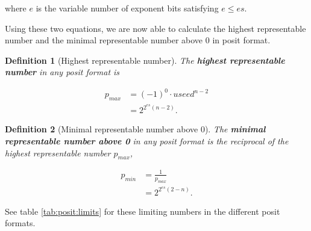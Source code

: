\documentclass{article}
\theoremstyle{plain} %
\newtheorem{definition}{Definition}[section]
\theoremstyle{convention} %
\theoremstyle{remark} %
\def\df#1{\textbf{\textit{#1}}}
\numberwithin{equation}{section}
\begin{document}
where $e$ is the variable number of exponent bits satisfying $e \le es$.

Using these two equations, we are now able to calculate the highest representable number and the minimal representable number above \num{0} in posit format.

\begin{definition}[Highest representable number]

The \df{highest representable number} in any posit format is

\begin{align*}
    p_{max} &= (-1)^0 \cdot useed^{n-2} \\
            &= 2^{2^{es}(n-2)}.
\end{align*}

\end{definition}

\begin{definition}[Minimal representable number above \num{0}]

The \df{minimal representable number above \num{0}} in any posit format is the reciprocal of the highest representable number $p_{max}$,

\begin{align*}
    p_{min} &= \frac{1}{p_{max}} \\
            &= 2^{2^{es}(2-n)}.
\end{align*}

\end{definition}

See table \ref{tab:posit:limits} for these limiting numbers in the different posit formats.
\end{document}
